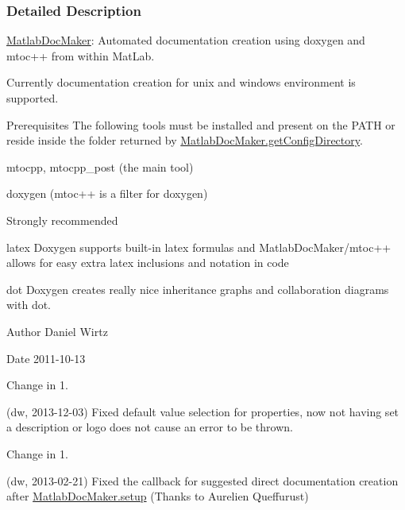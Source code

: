 \subsubsection{Detailed Description}
\hyperlink{class_matlab_doc_maker}{Matlab\+Doc\+Maker}\+: Automated documentation creation using doxygen and mtoc++ from within Mat\+Lab. 

Currently documentation creation for unix and windows environment is supported.

\begin{DoxyParagraph}{Prerequisites}
The following tools must be installed and present on the P\+A\+TH or reside inside the folder returned by \hyperlink{class_matlab_doc_maker_a11a2a8ec616df969a911b325e39b0b4f}{Matlab\+Doc\+Maker.\+get\+Config\+Directory}.
\begin{DoxyItemize}
\item {\ttfamily mtocpp}, {\ttfamily mtocpp\+\_\+post} (the main tool)
\item {\ttfamily doxygen} (mtoc++ is a filter for doxygen)
\end{DoxyItemize}
\end{DoxyParagraph}
\begin{DoxyParagraph}{Strongly recommended}

\begin{DoxyItemize}
\item {\ttfamily latex} Doxygen supports built-\/in latex formulas and Matlab\+Doc\+Maker/mtoc++ allows for easy extra latex inclusions and notation in code
\item {\ttfamily dot} Doxygen creates really nice inheritance graphs and collaboration diagrams with dot.
\end{DoxyItemize}
\end{DoxyParagraph}
\begin{DoxyAuthor}{Author}
Daniel Wirtz 
\end{DoxyAuthor}
\begin{DoxyDate}{Date}
2011-\/10-\/13
\end{DoxyDate}
\begin{DoxyRefDesc}{Change in 1.}
\item[\hyperlink{changelog1_5__changelog1_5000001}{Change in 1.\+5}](dw, 2013-\/12-\/03) Fixed default value selection for properties, now not having set a description or logo does not cause an error to be thrown.\end{DoxyRefDesc}


\begin{DoxyRefDesc}{Change in 1.}
\item[\hyperlink{changelog1_5__changelog1_5000002}{Change in 1.\+5}](dw, 2013-\/02-\/21) Fixed the callback for suggested direct documentation creation after \hyperlink{class_matlab_doc_maker_a434c176c2421dd18a40003919b19f4f2}{Matlab\+Doc\+Maker.\+setup} (Thanks to Aurelien Queffurust)\end{DoxyRefDesc}


